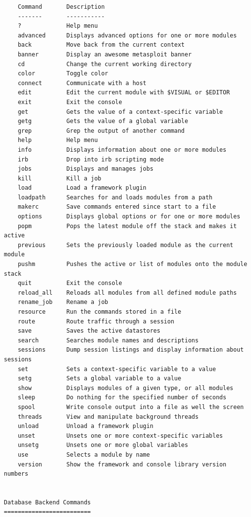 \documentclass[10pt,a4paper,titlepage]{article}
\begin{document}
\begin{verbatim}
    Command       Description
    -------       -----------
    ?             Help menu
    advanced      Displays advanced options for one or more modules
    back          Move back from the current context
    banner        Display an awesome metasploit banner
    cd            Change the current working directory
    color         Toggle color
    connect       Communicate with a host
    edit          Edit the current module with $VISUAL or $EDITOR
    exit          Exit the console
    get           Gets the value of a context-specific variable
    getg          Gets the value of a global variable
    grep          Grep the output of another command
    help          Help menu
    info          Displays information about one or more modules
    irb           Drop into irb scripting mode
    jobs          Displays and manages jobs
    kill          Kill a job
    load          Load a framework plugin
    loadpath      Searches for and loads modules from a path
    makerc        Save commands entered since start to a file
    options       Displays global options or for one or more modules
    popm          Pops the latest module off the stack and makes it active
    previous      Sets the previously loaded module as the current module
    pushm         Pushes the active or list of modules onto the module stack
    quit          Exit the console
    reload_all    Reloads all modules from all defined module paths
    rename_job    Rename a job
    resource      Run the commands stored in a file
    route         Route traffic through a session
    save          Saves the active datastores
    search        Searches module names and descriptions
    sessions      Dump session listings and display information about sessions
    set           Sets a context-specific variable to a value
    setg          Sets a global variable to a value
    show          Displays modules of a given type, or all modules
    sleep         Do nothing for the specified number of seconds
    spool         Write console output into a file as well the screen
    threads       View and manipulate background threads
    unload        Unload a framework plugin
    unset         Unsets one or more context-specific variables
    unsetg        Unsets one or more global variables
    use           Selects a module by name
    version       Show the framework and console library version numbers


Database Backend Commands
=========================


\end{verbatim}
\end{document}
